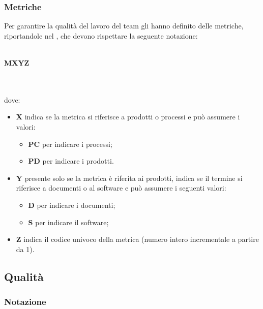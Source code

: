 \subsubsection{Metriche}
 Per garantire la qualità del lavoro del team gli \AMMP{} hanno definito delle metriche, riportandole
nel \PQdoc, che devono rispettare la seguente notazione:\\ \\
\centerline{\textbf{M\textbraceleft{}X\textbraceright{}\textbraceleft{}Y\textbraceright{}\textbraceleft{}Z\textbraceright{}}} \\ \\
dove:  
\begin{itemize}
	\item \textbf{X} indica se la metrica si riferisce a prodotti o processi e può assumere
i valori:
	\begin{itemize}
		\item \textbf{PC} per indicare i processi;
		\item \textbf{PD} per indicare i prodotti.
	\end{itemize}
	\item \textbf{Y} presente solo se la metrica è riferita ai prodotti, indica se il termine  si riferisce a documenti o al software e può assumere i seguenti valori:
	\begin{itemize}
		\item \textbf{D} per indicare i documenti;
		\item \textbf{S} per indicare il software;
	\end{itemize}
	\item \textbf{Z} indica il codice univoco della metrica (numero intero incrementale a partire da 1).
\end{itemize}
\subsection{Qualità}
\subsubsection{Notazione}
